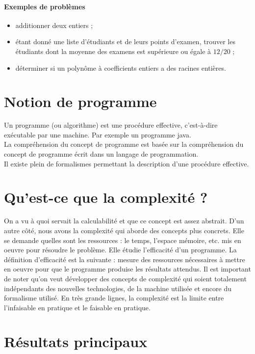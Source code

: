 \paragraph{Exemples de problèmes}
\begin{itemize}
	\item additionner deux entiers ;
	\item étant donné une liste d'étudiants et de leurs points d'examen, trouver les étudiants dont la moyenne des examens est supérieure ou égale à $12/20$ ;
	\item déterminer si un polynôme à coefficients entiers a des racines entières.
\end{itemize}

\section{Notion de programme}
\label{sec:notion_de_programme}

Un programme (ou algorithme) est une \og procédure effective\fg, c'est-à-dire exécutable par une machine. Par exemple un programme java.\\

La compréhension du concept de programme est basée sur la compréhension du concept de \og programme écrit dans un langage de programmation\fg.\\

Il existe plein de formalismes permettant la description d'une \og procédure effective\fg.

\section{Qu'est-ce que la complexité ?}
On a vu à quoi servait la calculabilité et que ce concept est assez abstrait. D'un autre côté, nous avons la complexité qui aborde des concepts plus concrets. Elle se demande quelles sont les ressources : le temps, l'espace mémoire, etc. mis en oeuvre pour résoudre le problème.
Elle étudie l'efficacité d'un programme. La définition d'efficacité est la suivante : mesure des ressources nécessaires à mettre en oeuvre pour que le programme produise les résultats attendus.
Il est important de noter qu'on veut développer des concepts de complexité qui soient totalement indépendants des nouvelles technologies, de la machine utilisée et encore du formalisme utilisé.
En très grande lignes, la complexité est la limite entre l'infaisable en pratique et le faisable en pratique. 


\section{Résultats principaux}
\label{sec:r_sultat_principaux}

